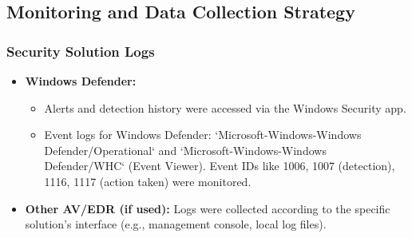 \documentclass[11pt]{article}
\begin{document}
				
				
			\subsection{Monitoring and Data Collection Strategy}
				\subsubsection{Security Solution Logs}
				\begin{itemize}
					\item \textbf{Windows Defender:}
					\begin{itemize}
						\item Alerts and detection history were accessed via the Windows Security app.
						\item Event logs for Windows Defender: `Microsoft-Windows-Windows Defender/Operational` and `Microsoft-Windows-Windows Defender/WHC` (Event Viewer). Event IDs like 1006, 1007 (detection), 1116, 1117 (action taken) were monitored.
					\end{itemize}
					\item \textbf{Other AV/EDR (if used):} Logs were collected according to the specific solution's interface (e.g., management console, local log files).
				\end{itemize}
				
\end{document}
